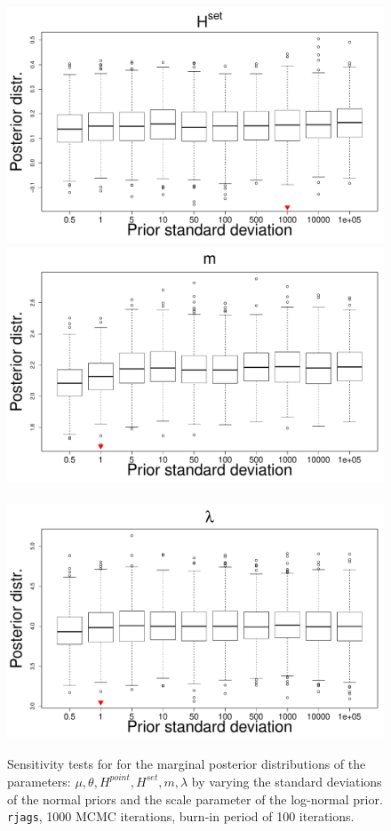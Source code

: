 \documentclass{statsoc}
\numberwithin{figure}{section}
\numberwithin{table}{section}
\begin{document}
\begin{figure}
\includegraphics[scale=0.25]{Sensitivity/H_set_sensitivity.pdf}\\
\includegraphics[scale=0.25]{Sensitivity/m_sensitivity.pdf}~
\includegraphics[scale=0.25]{Sensitivity/lambda_sensitivity.pdf}\\
\caption{Sensitivity tests for for the marginal posterior distributions of the parameters: $\mu, \theta, H^{point}, H^{set}, m, \lambda$ by varying the standard deviations of the normal priors and the scale parameter of the log-normal prior. {\tt rjags}, 1000 MCMC iterations, burn-in period of 100 iterations.}
\label{figS1}
\end{figure}
%
\end{document}
